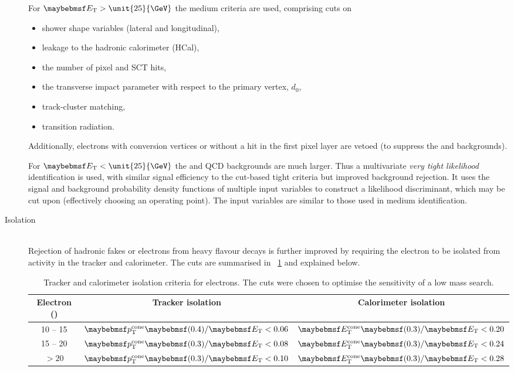 \begin{description}
	For $\et > \unit{25}{\GeV}$ the medium criteria are used, comprising cuts on
	\begin{itemize}[noitemsep,nolistsep]
		\item shower shape variables (lateral and longitudinal),
		\item leakage to the hadronic calorimeter (HCal),
		\item the number of pixel and SCT hits,
		\item the transverse impact parameter with respect to the primary vertex, $d_0$,
		\item track-cluster matching,
		\item transition radiation.
	\end{itemize}
	Additionally, electrons with conversion vertices or without a hit in the first 
	pixel layer are vetoed (to suppress the \Wgamma and \Wjets backgrounds).
 
 	For $\et < \unit{25}{\GeV}$ the \Wjets and QCD backgrounds are much larger. Thus a 
 	multivariate \textit{very tight likelihood} identification is used, with similar 
 	signal efficiency to the cut-based tight criteria but improved background rejection. 
 	It uses the signal and background probability density functions of multiple input 
 	variables to construct a likelihood discriminant, which may be cut upon (effectively 
 	choosing an operating point). The input variables are similar to those used in 
 	medium identification.

\item[Isolation] \hfill \\
	Rejection of hadronic fakes or electrons from heavy flavour decays is further 
	improved by requiring the electron to be isolated from activity in the tracker and 
	calorimeter. The cuts are summarised in \Table~\ref{tab:objects:el_iso} and explained 
	below.

	\begin{table}[t]
		\begin{tabular}{c@{\hskip 0.3in}c@{\hskip 0.3in}c}
			\toprule
			Electron \et (\GeV) & Tracker isolation & Calorimeter isolation \\
			\midrule
			10 -- 15 & $\ptcone{0.4}/\et < 0.06$ & $\etcone{0.3}/\et < 0.20$ \\
			15 -- 20 & $\ptcone{0.3}/\et < 0.08$ & $\etcone{0.3}/\et < 0.24$ \\
			$> 20$   & $\ptcone{0.3}/\et < 0.10$ & $\etcone{0.3}/\et < 0.28$ \\
			\bottomrule
		\end{tabular}
		\caption{Tracker and calorimeter isolation criteria for electrons. The cuts 
		were chosen to optimise the sensitivity of a low mass \HWWlvlv search.}
		\label{tab:objects:el_iso}
	\end{table}


\end{description}
